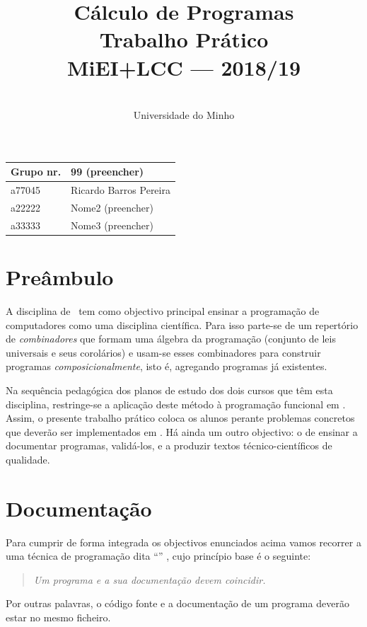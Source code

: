 \documentclass[a4paper]{article}
\title{
       	    Cálculo de Programas
\\
       	Trabalho Prático
\\
       	MiEI+LCC --- 2018/19
}
\author{
       	\dium
\\
       	Universidade do Minho
}
\date\mydate
\begin{document}
\maketitle

\begin{center}\large
\begin{tabular}{ll}
\textbf{Grupo} nr. & 99 (preencher)
\\\hline
a77045 & Ricardo Barros Pereira
\\
a22222 & Nome2 (preencher)	
\\
a33333 & Nome3 (preencher)	
\end{tabular}
\end{center}

\section{Preâmbulo}

A disciplina de \CP\ tem como objectivo principal ensinar
a progra\-mação de computadores como uma disciplina científica. Para isso
parte-se de um repertório de \emph{combinadores} que formam uma álgebra da
programação (conjunto de leis universais e seus corolários) e usam-se esses
combinadores para construir programas \emph{composicionalmente}, isto é,
agregando programas já existentes.
  
Na sequência pedagógica dos planos de estudo dos dois cursos que têm
esta disciplina, restringe-se a aplicação deste método à programação
funcional em \Haskell. Assim, o presente trabalho prático coloca os
alunos perante problemas concretos que deverão ser implementados em
\Haskell.  Há ainda um outro objectivo: o de ensinar a documentar
programas, validá-los, e a produzir textos técnico-científicos de
qualidade.

\section{Documentação} Para cumprir de forma integrada os objectivos
enunciados acima vamos recorrer a uma técnica de programa\-ção dita
``'' \cite{Kn92}, cujo princípio base é o seguinte:
\begin{quote}\em Um programa e a sua documentação devem coincidir.
\end{quote} Por outras palavras, o código fonte e a documentação de um
programa deverão estar no mesmo ficheiro.
\end{document}
